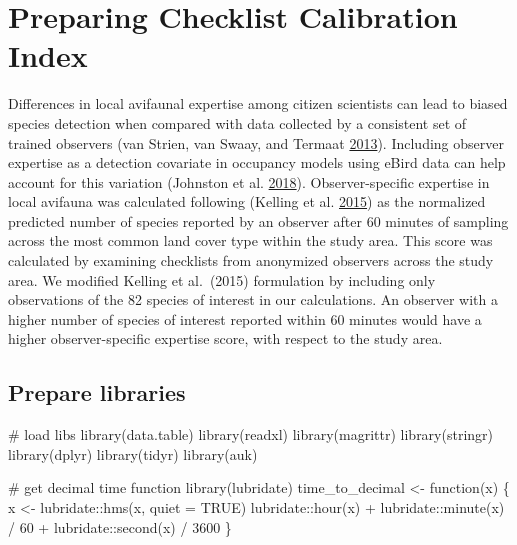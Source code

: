 \documentclass[
]{article}
\newenvironment{Shaded}{}{}
\newcommand{\CommentTok}[1]{\textcolor[rgb]{0.00,0.50,0.00}{#1}}
\newcommand{\ControlFlowTok}[1]{\textcolor[rgb]{0.00,0.00,1.00}{#1}}
\newcommand{\DataTypeTok}[1]{#1}
\newcommand{\DecValTok}[1]{#1}
\newcommand{\KeywordTok}[1]{\textcolor[rgb]{0.00,0.00,1.00}{#1}}
\newcommand{\NormalTok}[1]{#1}
\newcommand{\OperatorTok}[1]{#1}
\newcommand{\OtherTok}[1]{\textcolor[rgb]{1.00,0.25,0.00}{#1}}
\newcommand{\StringTok}[1]{\textcolor[rgb]{0.00,0.50,0.50}{#1}}
\begin{document}
\hypertarget{preparing-checklist-calibration-index}{%
\section{Preparing Checklist Calibration Index}\label{preparing-checklist-calibration-index}}

Differences in local avifaunal expertise among citizen scientists can lead to biased species detection when compared with data collected by a consistent set of trained observers (van Strien, van Swaay, and Termaat \protect\hyperlink{ref-vanstrien2013}{2013}). Including observer expertise as a detection covariate in occupancy models using eBird data can help account for this variation (Johnston et al. \protect\hyperlink{ref-johnston2018}{2018}). Observer-specific expertise in local avifauna was calculated following (Kelling et al. \protect\hyperlink{ref-kelling2015a}{2015}) as the normalized predicted number of species reported by an observer after 60 minutes of sampling across the most common land cover type within the study area. This score was calculated by examining checklists from anonymized observers across the study area. We modified Kelling et al.~(2015) formulation by including only observations of the 82 species of interest in our calculations. An observer with a higher number of species of interest reported within 60 minutes would have a higher observer-specific expertise score, with respect to the study area.

\hypertarget{prepare-libraries-2}{%
\subsection{Prepare libraries}\label{prepare-libraries-2}}

\begin{Shaded}
\begin{Highlighting}[]

\CommentTok{# load libs}
\KeywordTok{library}\NormalTok{(data.table)}
\KeywordTok{library}\NormalTok{(readxl)}
\KeywordTok{library}\NormalTok{(magrittr)}
\KeywordTok{library}\NormalTok{(stringr)}
\KeywordTok{library}\NormalTok{(dplyr)}
\KeywordTok{library}\NormalTok{(tidyr)}
\KeywordTok{library}\NormalTok{(auk)}

\CommentTok{# get decimal time function}
\KeywordTok{library}\NormalTok{(lubridate)}
\NormalTok{time_to_decimal <-}\StringTok{ }\ControlFlowTok{function}\NormalTok{(x) \{}
\NormalTok{  x <-}\StringTok{ }\NormalTok{lubridate}\OperatorTok{::}\KeywordTok{hms}\NormalTok{(x, }\DataTypeTok{quiet =} \OtherTok{TRUE}\NormalTok{)}
\NormalTok{  lubridate}\OperatorTok{::}\KeywordTok{hour}\NormalTok{(x) }\OperatorTok{+}\StringTok{ }\NormalTok{lubridate}\OperatorTok{::}\KeywordTok{minute}\NormalTok{(x) }\OperatorTok{/}\StringTok{ }\DecValTok{60} \OperatorTok{+}\StringTok{ }\NormalTok{lubridate}\OperatorTok{::}\KeywordTok{second}\NormalTok{(x) }\OperatorTok{/}\StringTok{ }\DecValTok{3600}
\NormalTok{\}}
\end{Highlighting}
\end{Shaded}
\end{document}
